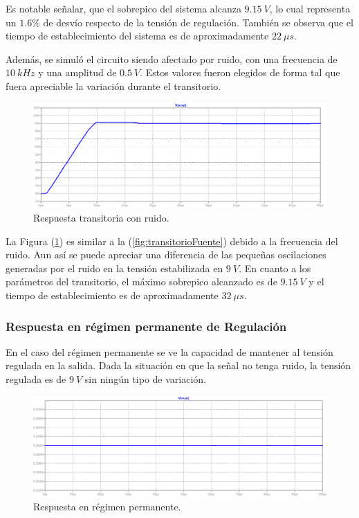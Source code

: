 Es notable señalar, que el sobrepico del sistema alcanza $9.15 \ V$, lo cual representa un $1.6\%$ de desvío respecto de la tensión de regulación. También se observa que el tiempo de establecimiento del sistema es de aproximadamente $22 \ \mu s$.

Además, se simuló el circuito siendo afectado por ruido, con una frecuencia de $10 \ kHz$ y una amplitud de $0.5 \ V$. Estos valores fueron elegidos de forma tal que fuera apreciable la variación  durante el transitorio.
\begin{figure}[H]
\centering
	\includegraphics[width=1\textwidth]{ImagenesEjercicio2/transrespnoise.png}
	\caption{Respuesta transitoria con ruido.}
	\label{fig:transitorioFuentenoise}
\end{figure}

La Figura (\ref{fig:transitorioFuentenoise}) es similar a la (\ref{fig:transitorioFuente}) debido a la frecuencia del ruido. Aun así se puede apreciar una diferencia de las pequeñas oscilaciones generadas por el ruido en la tensión estabilizada en $9 \ V$. En cuanto a los parámetros del transitorio, el máximo sobrepico alcanzado es de $9.15 \ V$ y el tiempo de establecimiento es de aproximadamente $32 \ \mu s$.

\subsubsection{Respuesta en régimen permanente de Regulación}
En el caso del régimen permanente se ve la capacidad de mantener al tensión regulada en la salida. Dada la situación en que la señal no tenga ruido, la tensión regulada es de $9 \ V$ sin ningún tipo de variación.
\begin{figure}[H]
\centering
	\includegraphics[width=1\textwidth]{ImagenesEjercicio2/permresp.png}
	\caption{Respuesta en régimen permanente.}
	\label{fig:permanenteFuente}
\end{figure}

